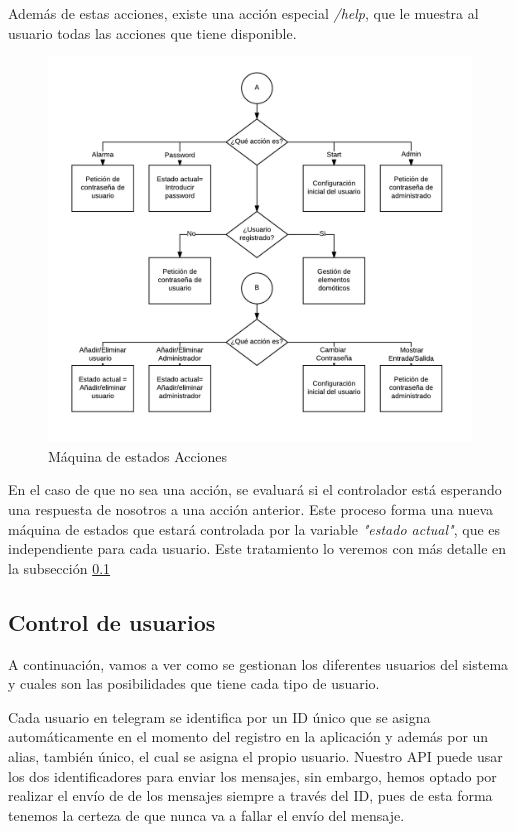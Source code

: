 \documentclass[10pt,journal,compsoc]{IEEEtran}
\begin{document}
Además de estas acciones, existe una acción especial \textit{/help}, que le muestra al usuario 
todas las acciones que tiene disponible.

\begin{figure}[h]
\centering
\includegraphics[scale=0.4]{MaqEstAcc}
\caption{Máquina de estados Acciones}
\label{fig:MaqEstAcc}
\end{figure}

En el caso de que no sea una acción, se evaluará si el controlador está esperando una respuesta 
de nosotros a una acción anterior. Este proceso forma una nueva máquina de estados que estará 
controlada por la variable \textit{"estado actual"}, que es independiente para cada usuario.
Este tratamiento lo veremos con más detalle en la subsección \ref{sec:ControlUsuarios}

\subsection{Control de usuarios}\label{sec:ControlUsuarios}

A continuación, vamos a ver como se gestionan los diferentes usuarios del sistema y cuales 
son las posibilidades que tiene cada tipo de usuario.

Cada usuario en telegram se identifica por un ID único que se asigna automáticamente en 
el momento del registro en la aplicación y además por un alias, también único, el cual se asigna el 
propio usuario. Nuestro API puede usar los dos identificadores para enviar los  mensajes, sin embargo, 
hemos optado por realizar el envío de de los mensajes siempre a través del ID, pues de esta forma 
tenemos la certeza de que nunca va a fallar el envío del mensaje. 
\end{document}
